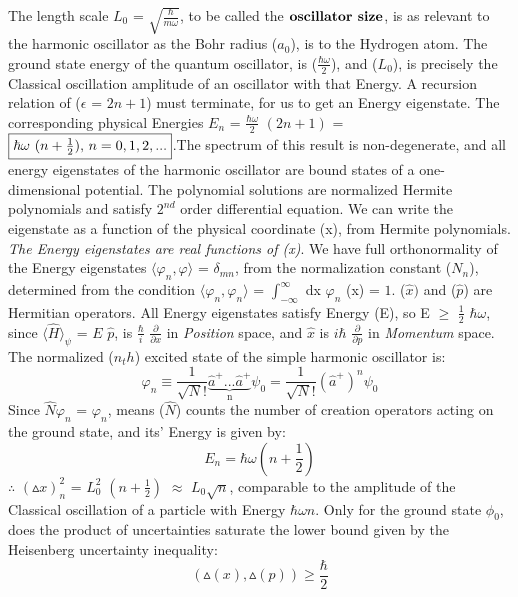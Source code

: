 \documentclass[a4paper, 10pt, onepage]{elegantbook}
\begin{document}
{The length scale $L_0$ = $\sqrt{\frac{\hbar}{m \omega}}$, to be called the $\mathbf{\textbf{oscillator size\index{oscillator size}}}$, is as relevant to the harmonic oscillator as the Bohr radius ($a_0$), is to the Hydrogen atom. The ground state energy of the quantum oscillator, is ($\frac{\hbar \omega}{2}$), and ($L_0$), is precisely the Classical oscillation amplitude of an oscillator with that Energy. A recursion relation of ($\epsilon$ = $2n + 1$) must terminate, for us to get an Energy eigenstate. The corresponding physical Energies $E_n$ = $\frac{\hbar \omega}{2}$ $(2n + 1)$ = $\boxed{\hbar \omega$ $(n + \frac{1}{2})$, $n = 0,1,2,...}$.The spectrum of this result is non-degenerate, and all energy eigenstates of the harmonic oscillator are bound states of a one-dimensional potential. The polynomial solutions are normalized Hermite polynomials and satisfy $2^{nd}$ order differential equation. We can write the eigenstate as a function of the physical coordinate (x), from Hermite polynomials. \emph{The Energy eigenstates are real functions of (x)}. We have full orthonormality of the Energy eigenstates $\langle \varphi_n, \varphi \rangle$ = $\delta_{mn}$, from the normalization
constant ($N_n$), determined from the condition $\langle \varphi_n, \varphi_n \rangle$ = $\int_{- \infty}^\infty$ dx $\varphi_n$ (x) = $1$. ($\hat x)$  and ($\hat p$) are Hermitian operators. All Energy eigenstates satisfy Energy (E),  so E $\geq$ $\frac{1}{2}$ $\hbar \omega$, since $\langle \hat H \rangle_\psi$ = $E$ $\hat p$, is $\frac{\hbar}{i}$ $\frac{\partial}{\partial x}$ in \emph{Position} space, and $\hat x$ is $i \hbar$ $\frac{\partial}{\partial p}$ in \emph{Momentum} space. The normalized ($n_th$) excited state of the simple harmonic oscillator is:
\begin{equation}
\varphi_n \equiv \frac{1}{\sqrt N!} \underbrace{\hat a^{+}...\hat a^{+}}_\text{n} \psi_0 = \frac{1}{\sqrt N!} (\hat a^{+})^n \psi_0
\end{equation}
Since $\hat N \varphi_n$ = $\varphi_n$, means ($\hat N$) counts the number of creation operators acting on the ground state, and its' Energy is given by:
\begin{equation}
E_n = \hbar \omega (n + \frac{1}{2})
\end{equation}
$\therefore$ $(\vartriangle x)^2_n$ = $L^2_0$ $(n + \frac{1}{2})$ $\approx$ $L_0 \sqrt{n}$, comparable to the amplitude of the Classical oscillation of a particle with Energy $\hbar \omega n$. Only for the ground state $\phi_0$, does the product of uncertainties saturate the lower bound given by the Heisenberg uncertainty inequality:
\begin{equation}
(\vartriangle(x), \vartriangle (p)) \geq \frac{\hbar}{2}
\end{equation}

}
\end{document}
